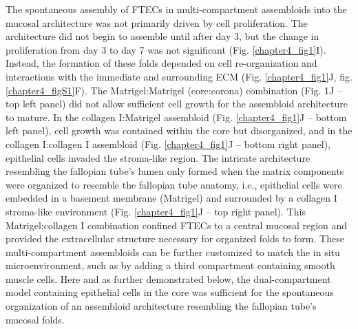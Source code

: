 \begin{refsection}
    The spontaneous assembly of FTECs in multi-compartment assembloids into the mucosal architecture was not primarily driven by cell proliferation. The architecture did not begin to assemble until after day 3, but the change in proliferation from day 3 to day 7 was not significant (Fig. \ref{chapter4_fig1}I). Instead, the formation of these folds depended on cell re-organization and interactions with the immediate and surrounding ECM (Fig. \ref{chapter4_fig1}J, fig. \ref{chapter4_figS1}F). The Matrigel:Matrigel (core:corona) combination (Fig. 1J – top left panel) did not allow sufficient cell growth for the assembloid architecture to mature. In the collagen I:Matrigel assembloid (Fig. \ref{chapter4_fig1}J – bottom left panel), cell growth was contained within the core but disorganized, and in the collagen I:collagen I assembloid (Fig. \ref{chapter4_fig1}J – bottom right panel), epithelial cells invaded the stroma-like region. The intricate architecture resembling the fallopian tube’s lumen only formed when the matrix components were organized to resemble the fallopian tube anatomy, i.e., epithelial cells were embedded in a basement membrane (Matrigel) and surrounded by a collagen I stroma-like environment (Fig. \ref{chapter4_fig1}J – top right panel). This Matrigel:collagen I combination confined FTECs to a central mucosal region and provided the extracellular structure necessary for organized folds to form. 
    These multi-compartment assembloids can be further customized to match the in situ microenvironment, such as by adding a third compartment containing smooth muscle cells. Here and as further demonstrated below, the dual-compartment model containing epithelial cells in the core was sufficient for the spontaneous organization of an assembloid architecture resembling the fallopian tube’s mucosal folds.


\end{refsection}
